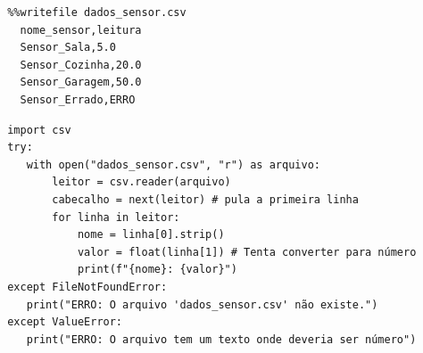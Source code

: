 \documentclass[../numerical_methods.tex]{subfiles}
\begin{document}
\begin{listing}
	\begin{verbatim}
 %%writefile dados_sensor.csv
   nome_sensor,leitura 
   Sensor_Sala,5.0 
   Sensor_Cozinha,20.0 
   Sensor_Garagem,50.0
   Sensor_Errado,ERRO
 \end{verbatim}

	\begin{verbatim}
 import csv 
 try:
    with open("dados_sensor.csv", "r") as arquivo:
        leitor = csv.reader(arquivo)
        cabecalho = next(leitor) # pula a primeira linha 
        for linha in leitor:
            nome = linha[0].strip()
            valor = float(linha[1]) # Tenta converter para número 
            print(f"{nome}: {valor}")
 except FileNotFoundError:
    print("ERRO: O arquivo 'dados_sensor.csv' não existe.")
 except ValueError:
    print("ERRO: O arquivo tem um texto onde deveria ser número")
 \end{verbatim}
\end{listing}
\end{document}
